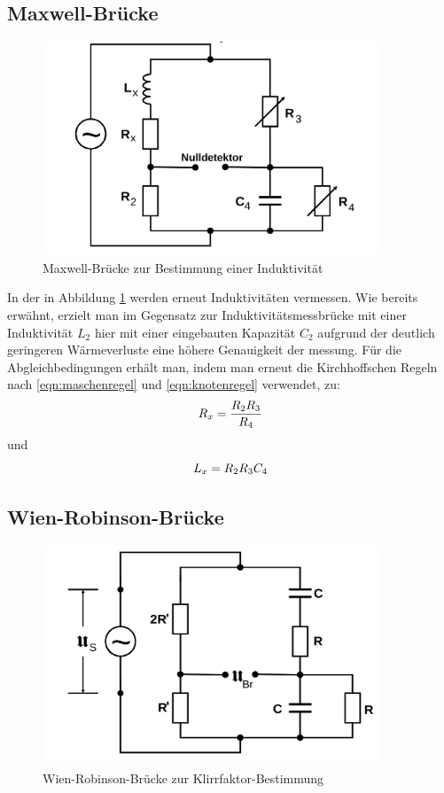 \subsection{Maxwell-Brücke}
\begin{figure}
  \centering
  \includegraphics[width=0.9\textwidth]{Bilder/maxwell_bruecke.png}
  \caption{Maxwell-Brücke zur Bestimmung einer Induktivität \cite{Anleitung}}
  \label{fig:maxwellbrücke}
\end{figure}
In der in Abbildung \ref{fig:maxwellbrücke} werden erneut Induktivitäten vermessen.
Wie bereits erwähnt, erzielt man im Gegensatz zur Induktivitätsmessbrücke
mit einer Induktivität $L_2$ hier mit einer eingebauten Kapazität $C_2$ aufgrund der deutlich geringeren Wärmeverluste eine höhere Genauigkeit der messung.
Für die Abgleichbedingungen erhält man, indem man erneut die Kirchhoffschen Regeln nach \eqref{eqn:maschenregel} und \eqref{eqn:knotenregel} verwendet, zu:
\begin{equation}
\label{eqn:maxwellr}
\centering
R_x=\frac{R_2R_3}{R_4}
\end{equation}
und
\begin{equation}
\centering
\label{eqn:maxwellinduktivität}
L_x=R_2R_3C_4
\end{equation}
\subsection{Wien-Robinson-Brücke}
\begin{figure}
  \centering
  \includegraphics[width=0.9\textwidth]{Bilder/wien_robinson_bruecke.png}
  \caption{Wien-Robinson-Brücke zur Klirrfaktor-Bestimmung \cite{Anleitung}}
  \label{fig:wienrobinsonbrücke}
\end{figure}

